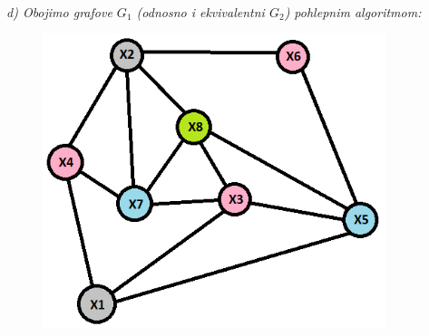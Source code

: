 \documentclass[12pt]{article}
\begin{document}
\begin{enumerate}
\begin{center}
    \vspace{0.3cm}
\textit{\\d) Obojimo grafove $G_1$ (odnosno i ekvivalentni $G_2$) pohlepnim algoritmom:}  \\

\begin{figure}[htp]
    \centering
    \includegraphics[width=10cm]{g1obojenekvivalentanG2.png}
\end{figure}


\end{center}
\end{enumerate}
\end{document}
